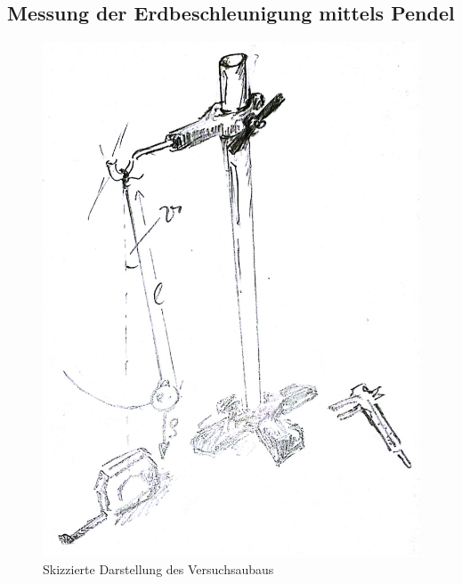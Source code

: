 \documentclass[12pt,a4paper]{article}
\begin{document}
\begin{multicols}{2}
\section{Messung der Erdbeschleunigung mittels Pendel}
\begin{figure}[H]
	\centering
  	\includegraphics[scale=0.4]{./figure/pendel.png}
	\caption{Skizzierte Darstellung des Versuchsaubaus}
	\label{fig:301}
\end{figure}


\end{multicols}
\end{document}
